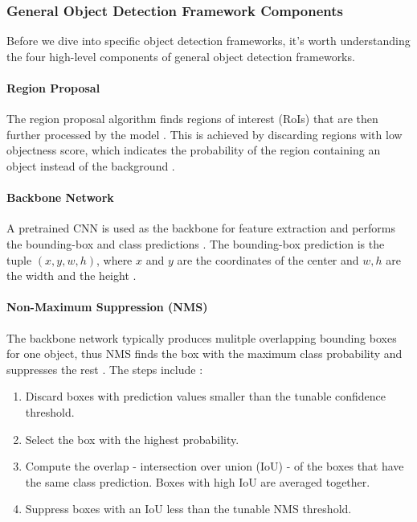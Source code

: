\documentclass[a4paper, 11pt, oneside]{article}
\begin{document}
  \subsubsection{General Object Detection Framework Components}

  \label{sec:generalobjectdetection}

  Before we dive into specific object detection frameworks, it's worth understanding the four high-level components of
  general object detection frameworks.

  \paragraph{Region Proposal}

  The region proposal algorithm finds regions of interest (RoIs) that are then further processed by the model
  \cite{elgendy2020deep}. This is achieved by discarding regions with low objectness score, which indicates the probability
  of the region containing an object instead of the background \cite{elgendy2020deep}.

  \paragraph{Backbone Network}

  A pretrained CNN is used as the backbone for feature extraction and performs the bounding-box and class predictions
  \cite{elgendy2020deep}. The bounding-box prediction is the tuple $(x, y, w, h)$, where $x$ and $y$ are the coordinates
  of the center and $w, h$ are the width and the height \cite{elgendy2020deep}.

  \paragraph{Non-Maximum Suppression (NMS)}

  The backbone network typically produces mulitple overlapping bounding boxes for one object, thus NMS finds
  the box with the maximum class probability and suppresses the rest \cite{elgendy2020deep}. The steps include
  \cite{elgendy2020deep}:

  \begin{enumerate}
    \item Discard boxes with prediction values smaller than the tunable confidence threshold.
    \item Select the box with the highest probability.
    \item Compute the overlap - intersection over union (IoU) - of the boxes that have the same class prediction.
    Boxes with high IoU are averaged together.
    \item Suppress boxes with an IoU less than the tunable NMS threshold.
  \end{enumerate}
\end{document}
